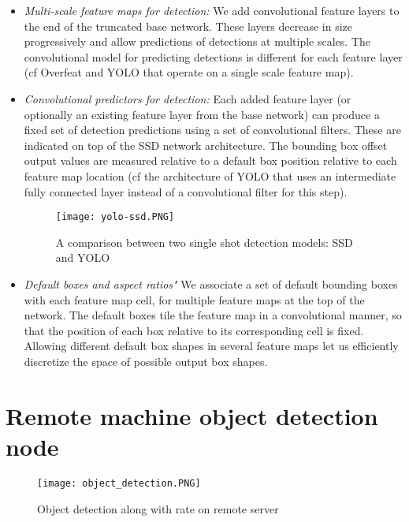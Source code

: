 		\begin{itemize}
			\item \emph{Multi-scale feature maps for detection:} We add convolutional feature layers to the end of the truncated base network. These layers decrease in size progressively and allow predictions of detections at multiple scales. The convolutional model for predicting detections is different for each feature layer (cf Overfeat and YOLO that operate on a single scale feature map).
			
			\item \emph{Convolutional predictors for detection:} Each added feature layer (or optionally an existing feature layer from the base network) can produce a fixed set of detection predictions using a set of convolutional filters. These are indicated on top of the SSD network architecture. The bounding box offset output values are measured relative to a default box position relative to each feature map location (cf the architecture of YOLO that
			uses an intermediate fully connected layer instead of a convolutional filter for this step).
			\begin{figure}[htbp]
				\centering
				\texttt{[image: yolo-ssd.PNG]}
				\caption{A comparison between two single shot detection models: SSD and YOLO\label{A comparison between two single shot detection models: SSD and YOLO}}
			\end{figure}
			
			\item \emph{Default boxes and aspect ratios"} We associate a set of default bounding boxes with each feature map cell, for multiple feature maps at the top of the network. The default boxes tile the feature map in a convolutional manner, so that the position of each box relative to its corresponding cell is fixed. Allowing different default box shapes in several feature maps let us efficiently discretize the space of possible output box shapes.
		\end{itemize}
		
		
	\section{Remote machine object detection node}
	\label{sec:Remote machine object detection node}
	
	\begin{figure}[htbp]
		\centering
		\texttt{[image: object\_detection.PNG]}
		\caption{Object detection along with rate on remote server\label{ROS working}}
	\end{figure}
	
